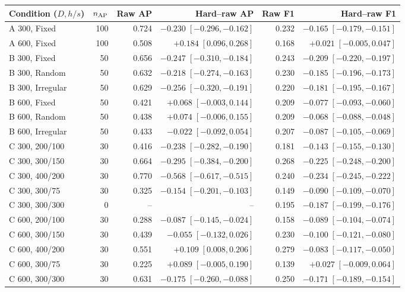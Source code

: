 \begin{tabular}{lrrrrr}
\toprule
Condition ($D,h/s$) & $n_{\rm AP}$ & Raw AP & Hard--raw AP & Raw F1 & Hard--raw F1 \\
\midrule
A 300, Fixed & 100 & 0.724 & $-0.230\;[-0.296,-0.162]$ & 0.232 & $-0.165\;[-0.179,-0.151]$ \\
A 600, Fixed & 100 & 0.508 & $+0.184\;[0.096,0.268]$ & 0.168 & $+0.021\;[-0.005,0.047]$ \\
B 300, Fixed & 50 & 0.656 & $-0.247\;[-0.310,-0.184]$ & 0.243 & $-0.209\;[-0.220,-0.197]$ \\
B 300, Random & 50 & 0.632 & $-0.218\;[-0.274,-0.163]$ & 0.230 & $-0.185\;[-0.196,-0.173]$ \\
B 300, Irregular & 50 & 0.629 & $-0.256\;[-0.320,-0.191]$ & 0.220 & $-0.181\;[-0.195,-0.167]$ \\
B 600, Fixed & 50 & 0.421 & $+0.068\;[-0.003,0.144]$ & 0.209 & $-0.077\;[-0.093,-0.060]$ \\
B 600, Random & 50 & 0.438 & $+0.074\;[-0.006,0.155]$ & 0.209 & $-0.068\;[-0.088,-0.048]$ \\
B 600, Irregular & 50 & 0.433 & $-0.022\;[-0.092,0.054]$ & 0.207 & $-0.087\;[-0.105,-0.069]$ \\
C 300, 200/100 & 30 & 0.416 & $-0.238\;[-0.282,-0.190]$ & 0.181 & $-0.143\;[-0.155,-0.130]$ \\
C 300, 300/150 & 30 & 0.664 & $-0.295\;[-0.384,-0.200]$ & 0.268 & $-0.225\;[-0.248,-0.200]$ \\
C 300, 400/200 & 30 & 0.770 & $-0.568\;[-0.617,-0.515]$ & 0.240 & $-0.234\;[-0.245,-0.222]$ \\
C 300, 300/75 & 30 & 0.325 & $-0.154\;[-0.201,-0.103]$ & 0.149 & $-0.090\;[-0.109,-0.070]$ \\
C 300, 300/300 & 0 & -- & -- & 0.195 & $-0.187\;[-0.199,-0.176]$ \\
C 600, 200/100 & 30 & 0.288 & $-0.087\;[-0.145,-0.024]$ & 0.158 & $-0.089\;[-0.104,-0.074]$ \\
C 600, 300/150 & 30 & 0.439 & $-0.055\;[-0.132,0.026]$ & 0.230 & $-0.100\;[-0.121,-0.080]$ \\
C 600, 400/200 & 30 & 0.551 & $+0.109\;[0.008,0.206]$ & 0.279 & $-0.083\;[-0.117,-0.050]$ \\
C 600, 300/75 & 30 & 0.225 & $+0.089\;[-0.005,0.190]$ & 0.139 & $+0.027\;[-0.009,0.064]$ \\
C 600, 300/300 & 30 & 0.631 & $-0.175\;[-0.260,-0.088]$ & 0.250 & $-0.171\;[-0.189,-0.154]$ \\
\bottomrule
\end{tabular}
